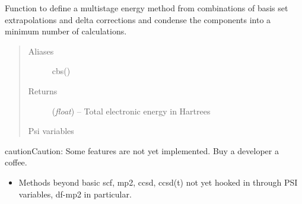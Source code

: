 \documentclass[letterpaper,10pt,english]{sphinxmanual}
\begin{document}
\begin{fulllineitems}
\label{index:wrappers.complete_basis_set}
Function to define a multistage energy method from combinations of
basis set extrapolations and delta corrections and condense the
components into a minimum number of calculations.
\begin{quote}\begin{description}
\item[{Aliases }] \leavevmode
cbs()

\item[{Returns}] \leavevmode
(\emph{float}) -- Total electronic energy in Hartrees

\item[{Psi variables}] \leavevmode
\end{description}\end{quote}

\begin{fulllineitems}
\label{index:envvar-CBSTOTALENERGY}\label{index:envvar-CBSREFERENCEENERGY}\label{index:envvar-CBSCORRELATIONENERGY}\label{index:envvar-CURRENTENERGY}\label{index:envvar-CURRENTREFERENCEENERGY}\label{index:envvar-CURRENTCORRELATIONENERGY}
\end{fulllineitems}


\begin{notice}{caution}{Caution:}
Some features are not yet implemented. Buy a developer a coffee.
\begin{itemize}
\item {} 
Methods beyond basic scf, mp2, ccsd, ccsd(t) not yet hooked in through PSI variables, df-mp2 in particular.


\end{itemize}
\end{notice}
\end{fulllineitems}
\end{document}
